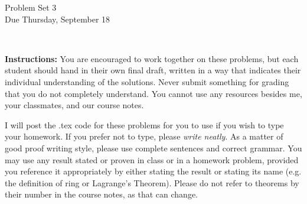 \documentclass[11pt]{article}
\title{}
\date{\vspace{-0.5in}}
\theoremstyle{definition}
\begin{document}
\thispagestyle{fancy}
\pagestyle{fancy}

\vspace{3em}

\begin{center}
	{\LARGE Problem Set 3 \\}
	Due Thursday, September 18
\end{center}

\

\noindent
{\bf Instructions:}
You are encouraged to work together on these problems, but each student should hand in their own final draft, written in a way that indicates their individual understanding of the solutions. Never submit something for grading that you do not completely understand. You cannot use any resources besides me, your classmates, and our course notes.


I will post the .tex code for these problems for you to use if you wish to type your homework. If you prefer not to type, please  {\em write neatly}. As a matter of good proof writing style, please use complete sentences and correct grammar. You may use any result stated or proven in class or in a homework problem, provided you reference it appropriately by either stating the result or stating its name (e.g. the definition of ring or Lagrange's Theorem). Please do not refer to theorems by their number in the course notes, as that can change.


\




\
\end{document}
